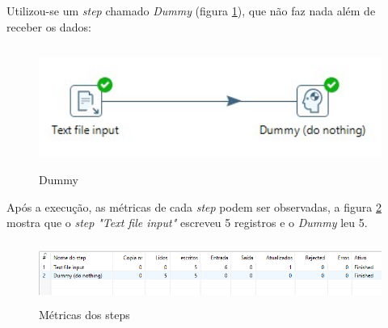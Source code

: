 Utilizou-se um \textit{step} chamado \textit{Dummy} (figura \ref{dummy}), que não faz nada além de receber os dados:
\begin{figure}[H]
\centering
\includegraphics[height=4cm]{imagens/example1.png}
\caption{Dummy}
\label{dummy}
\end{figure}
Após a execução, as métricas de cada \textit{step} podem ser observadas, a figura \ref{metrics} mostra que o \textit{step} \textit{"Text file input" }escreveu 5 registros e o \textit{Dummy} leu 5.
\begin{figure}[H]
\centering
\includegraphics[height=2cm]{imagens/metrics.png}
\caption{Métricas dos steps}
\label{metrics}
\end{figure}
\vfill
